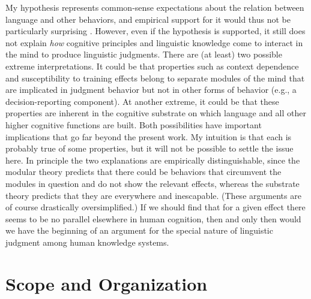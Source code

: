 My hypothesis represents common-sense expectations about the relation between language and other behaviors, and empirical support for it would thus not be particularly surprising \citep{Bever1970a}. However, even if the hypothesis is supported, it still does not explain \textit{how} cognitive principles and linguistic knowledge come to interact in the mind to produce linguistic judgments. There are (at least) two possible extreme interpretations. It could be that properties such as context dependence and susceptibility to training effects belong to separate modules of the mind that are implicated in judgment behavior but not in other forms of behavior (e.g., a decision-reporting component). At another extreme, it could be that these properties are inherent in the cognitive substrate on which language and all other higher cognitive functions are built. Both possibilities have important implications that go far beyond the present work. My intuition is that each is probably true of some properties, but it will not be possible to settle the issue here. In principle the two explanations are empirically distinguishable, since the modular theory predicts that there could be behaviors that circumvent the modules in question and do not show the relevant effects, whereas the substrate theory predicts that they are everywhere and inescapable. (These arguments
are of course drastically oversimplified.) If we should find that for a given effect
there seems to be no parallel elsewhere in human cognition, then and only then would we have the beginning of an argument for the special nature of linguistic judgment among human knowledge systems.


\section{Scope and Organization}\label{sec:1.5}

